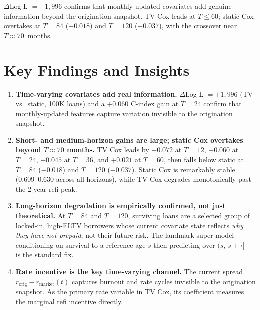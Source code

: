 \documentclass[11pt,a4paper]{article}
\begin{document}
$\Delta$Log-L $= +1{,}996$ confirms that monthly-updated covariates add genuine information
beyond the origination snapshot. TV Cox leads at $T\leq60$; static Cox overtakes
at $T=84$ ($-0.018$) and $T=120$ ($-0.037$), with the crossover near $T\approx70$~months.

\section{Key Findings and Insights}

\begin{enumerate}[leftmargin=1.6em,itemsep=3pt]

  \item \textbf{Time-varying covariates add real information.}
        $\Delta$Log-L $= +1{,}996$ (TV vs.\ static, 100K loans) and a $+0.060$ C-index gain
        at $T=24$ confirm that monthly-updated features capture variation invisible to the
        origination snapshot.

  \item \textbf{Short- and medium-horizon gains are large; static Cox overtakes beyond $T\approx70$ months.}
        TV Cox leads by $+0.072$ at $T=12$, $+0.060$ at $T=24$, $+0.045$ at $T=36$,
        and $+0.021$ at $T=60$, then falls below static at $T=84$ ($-0.018$) and
        $T=120$ ($-0.037$). Static Cox is remarkably stable (0.609--0.630 across all horizons),
        while TV Cox degrades monotonically past the 2-year refi peak.

  \item \textbf{Long-horizon degradation is empirically confirmed, not just theoretical.}
        At $T=84$ and $T=120$, surviving loans are a selected group of locked-in,
        high-ELTV borrowers whose current covariate state reflects \emph{why they have not
        prepaid}, not their future risk. The landmark super-model --- conditioning on survival
        to a reference age $s$ then predicting over $(s,\, s+\tau]$ --- is the standard fix.

  \item \textbf{Rate incentive is the key time-varying channel.}
        The current spread $r_{\text{orig}} - r_{\text{market}}(t)$ captures burnout and
        rate cycles invisible to the origination snapshot.
        As the primary rate variable in TV Cox, its coefficient measures the marginal
        refi incentive directly.


\end{enumerate}
\end{document}
